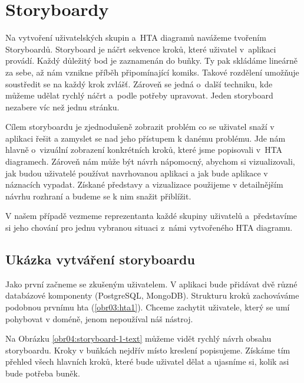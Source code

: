 \chapter{Storyboardy}

Na vytvoření uživatelských skupin a~HTA diagramů navážeme tvořením Storyboardů. Storyboard je náčrt sekvence kroků, které uživatel v~aplikaci provádí. Každý důležitý bod je zaznamenán do buňky. Ty pak skládáme lineárně za sebe, až nám vznikne příběh připomínající komiks. Takové rozdělení umožňuje soustředit se na každý krok zvlášť. Zároveň se jedná o~další techniku, kde můžeme udělat rychlý náčrt a~podle potřeby upravovat. Jeden storyboard nezabere víc než jednu stránku.

Cílem storyboardu je zjednodušeně zobrazit problém co se uživatel snaží v aplikaci řešit a zamyslet se nad jeho přístupem k danému problému. Jde nám hlavně o~vizuální zobrazení konkrétních kroků, které jsme popisovali v~HTA diagramech. Zároveň nám může být návrh nápomocný, abychom si vizualizovali, jak budou uživatelé používat navrhovanou aplikaci a jak bude aplikace v náznacích vypadat. Získané představy a vizualizace použijeme v detailnějším návrhu rozhraní a budeme se k nim snažit přiblížit.

V našem případě vezmeme reprezentanta každé skupiny uživatelů a~představíme si jeho chování pro jednu vybranou situaci z~námi vytvořeného HTA diagramu.

\section{Ukázka vytváření storyboardu}

Jako první začneme se zkušeným uživatelem. V aplikaci bude přidávat dvě různé databázové komponenty (PostgreSQL, MongoDB). Strukturu kroků zachováváme podobnou prvnímu hta (\ref{obr03:hta1}). Chceme zachytit uživatele, který se umí pohybovat v doméně, jenom nepoužíval náš nástroj.

Na Obrázku \ref{obr04:storyboard-1-text} můžeme vidět rychlý návrh obsahu storyboardu. Kroky v buňkách nejdřív místo kreslení popisujeme. Získáme tím přehled všech hlavních kroků, které bude uživatel dělat a ujasníme si, kolik asi bude potřeba buněk.

